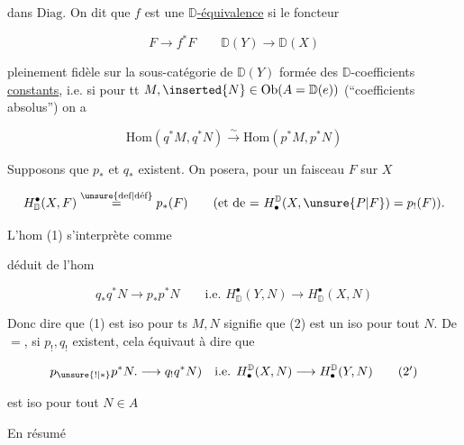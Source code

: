 dans $\mathrm{Diag}$. On dit que $f$ est une \uline{$\mathbb D$-équivalence} si le foncteur

\[ F\longrightarrow f^*F \qquad \mathbb D(Y)\longrightarrow\mathbb D(X) \]

  pleinement fidèle sur la sous-catégorie de $\mathbb D(Y)$ formée des $\mathbb D$-coefficients \uline{constants}, i.e. si pour tt $M,\inserted{N}\in\mathrm{Ob}(A=\mathbb D(e))$ (``coefficients absolus'') on a

\[ \mathrm{Hom}(q^*M,q^*N)\xrightarrow{\sim}\mathrm{Hom}(p^*M,p^*N) \tag*{(1)} \]

Supposons que $p_*$ et $q_*$ existent. On posera, pour un faisceau $F$ sur $X$

\[ H^{\bullet}_{\mathbb D}(X,F)\overset{\text{\unsure{def|déf}}}{=}p_*(F)\qquad
(\text{et de }{=} \ H_{\bullet}^{\mathbb D}(X,\unsure{P|F})=p_!(F)). \]


L'hom (1) s'interprète  comme


déduit de l'hom

\[ q_*q^*N\longrightarrow p_*p^*N\qquad\text{i.e. }H^\bullet_{\mathbb D}(Y,N)\longrightarrow H^\bullet_{\mathbb D}(X,N)\tag*{(2)} \]

Donc dire que (1) est iso pour ts $M,N$ signifie que (2) est un iso pour tout $N$. De $=$, si $p_!,q_!$ existent, cela équivaut à dire que

\[ p_{\unsure{!|*}}p^*N.\longrightarrow q_!q^*N)\quad\text{i.e. }H_\bullet^{\mathbb D}(X,N)\longrightarrow H_\bullet^{\mathbb D}(Y,N)\tag*{($2'$)} \]

est  iso  pour tout $N\in A$

En résumé


